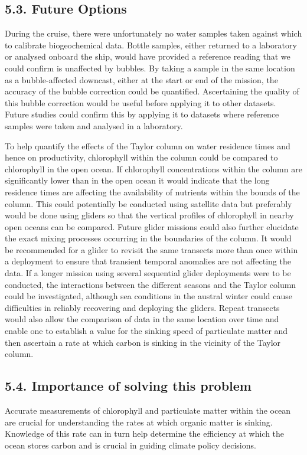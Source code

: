 \documentclass[
	a4paper, %
	10pt, %
	unnumberedsections, %
	twoside, %
]{LTJournalArticle}
\begin{document}
\begin{multicols}{2}


\subsection{5.3. Future Options}
During the cruise, there were unfortunately no water samples taken against which to calibrate biogeochemical data. Bottle samples, either
returned to a laboratory or analysed onboard the ship, would have provided a reference reading that we could confirm is unaffected by bubbles.
By taking a sample in the same location as a bubble-affected downcast, either at the start or end of the mission, the accuracy of the bubble
correction could be quantified. Ascertaining the quality of this bubble correction would be useful before applying it to other datasets. Future
studies could confirm this by applying it to datasets where reference samples were taken and analysed in a laboratory.

To help quantify the effects of the Taylor column on water residence times and hence on productivity, chlorophyll within the column could be
compared to chlorophyll in the open ocean. If chlorophyll concentrations within the column are significantly lower than in the open ocean it
would indicate that the long residence times are affecting the availability of nutrients within the bounds of the column. This could potentially
be conducted using satellite data but preferably would be done using gliders so that the vertical profiles of chlorophyll in nearby open oceans
can be compared. Future glider missions could also further elucidate the exact mixing processes occurring in the boundaries of the column. It
would be recommended for a glider to revisit the same transects more than once within a deployment to ensure that transient temporal anomalies
are not affecting the data. If a longer mission using several sequential glider deployments were to be conducted, the interactions between the
different seasons and the Taylor column could be investigated, although sea conditions in the austral winter could cause difficulties in reliably
recovering and deploying the gliders. Repeat transects would also allow the comparison of data in the same location over time and enable one to
establish a value for the sinking speed of particulate matter and then ascertain a rate at which carbon is sinking in the vicinity of the Taylor
column.

\subsection{5.4. Importance of solving this problem}
Accurate measurements of chlorophyll and particulate matter within the ocean are crucial for understanding the rates at which organic matter is
sinking. Knowledge of this rate can in turn help determine the efficiency at which the ocean stores carbon and is crucial in guiding climate policy
decisions.


\end{multicols}
\end{document}
